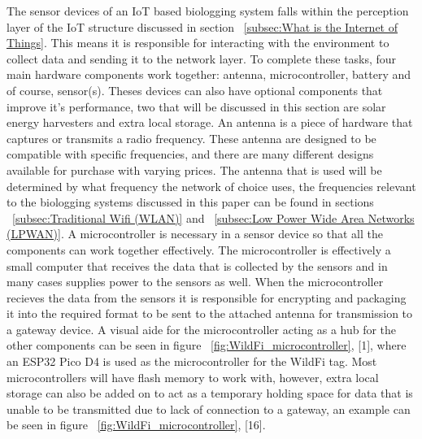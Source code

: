 \documentclass[sigplan,screen,nonacm]{acmart}
\begin{document}
The sensor devices of an IoT based biologging system falls within the perception layer of the IoT 
structure discussed in section ~\ref{subsec:What is the Internet of Things}. This means it is responsible 
for interacting with the environment to collect data and sending it to the network layer. To complete these 
tasks, four main hardware components work together: antenna, microcontroller, battery and of course, sensor(s). 
Theses devices can also have optional components that improve it's performance, two that will be discussed in 
this section are solar energy harvesters and extra local storage. 
An antenna is a piece of hardware that captures or transmits a radio frequency. These antenna are designed to 
be compatible with specific frequencies\cite{Sheldon_2023}, and there are many different designs available for 
purchase with varying prices. The antenna that is used will be determined by what frequency the network of choice 
uses, the frequencies relevant to the biologging systems discussed in this paper can be found in sections 
~\ref{subsec:Traditional Wifi (WLAN)} and ~\ref{subsec:Low Power Wide Area Networks (LPWAN)}.
A microcontroller is necessary in a sensor device so that all the components can work together effectively. The 
microcontroller is effectively a small computer that receives the data that is collected by the sensors and in 
many cases supplies power to the sensors as well. When the microcontroller recieves the data from the sensors 
it is responsible for encrypting and packaging it into the required format to be sent to the attached antenna 
for transmission to a gateway device. A visual aide for the microcontroller acting as a hub for the other 
components can be seen in figure ~\ref{fig:WildFi_microcontroller}, [1], where an ESP32 Pico D4 is used as the 
microcontroller for the WildFi tag. Most microcontrollers will have flash memory to work with, however, 
extra local storage can also be added on to act as a temporary holding space for data that is unable to be 
transmitted due to lack of connection to a gateway, an example can be seen in figure ~\ref{fig:WildFi_microcontroller}, [16].
\end{document}
